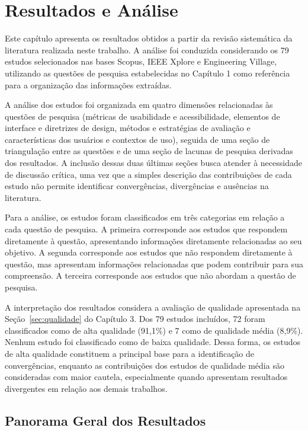 \chapter{Resultados e Análise}

\label{sec:resultados}

Este capítulo apresenta os resultados obtidos a partir da revisão sistemática da literatura realizada neste trabalho. A análise foi conduzida considerando os 79 estudos selecionados nas bases Scopus, IEEE Xplore e Engineering Village, utilizando as questões de pesquisa estabelecidas no Capítulo 1 como referência para a organização das informações extraídas.

A análise dos estudos foi organizada em quatro dimensões relacionadas às questões de pesquisa (métricas de usabilidade e acessibilidade, elementos de interface e diretrizes de design, métodos e estratégias de avaliação e características dos usuários e contextos de uso), seguida de uma seção de triangulação entre as questões e de uma seção de lacunas de pesquisa derivadas dos resultados. A inclusão dessas duas últimas seções busca atender à necessidade de discussão crítica, uma vez que a simples descrição das contribuições de cada estudo não permite identificar convergências, divergências e ausências na literatura.

Para a análise, os estudos foram classificados em três categorias em relação a cada questão de pesquisa. A primeira corresponde aos estudos que respondem diretamente à questão, apresentando informações diretamente relacionadas ao seu objetivo. A segunda corresponde aos estudos que não respondem diretamente à questão, mas apresentam informações relacionadas que podem contribuir para sua compreensão. A terceira corresponde aos estudos que não abordam a questão de pesquisa.

A interpretação dos resultados considera a avaliação de qualidade apresentada na Seção~\ref{sec:qualidade} do Capítulo 3. Dos 79 estudos incluídos, 72 foram classificados como de alta qualidade (91,1\%) e 7 como de qualidade média (8,9\%). Nenhum estudo foi classificado como de baixa qualidade. Dessa forma, os estudos de alta qualidade constituem a principal base para a identificação de convergências, enquanto as contribuições dos estudos de qualidade média são consideradas com maior cautela, especialmente quando apresentam resultados divergentes em relação aos demais trabalhos.

\section{Panorama Geral dos Resultados}

